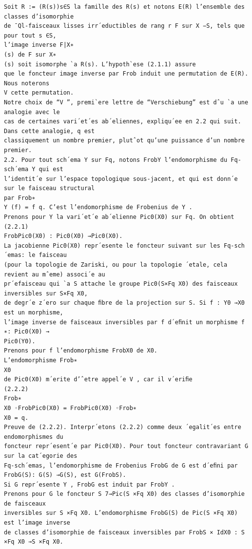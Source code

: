 \documentclass[11pt]{article}
\begin{document}
\begin{Verbatim}[breaklines=true,fontsize=\small]
Soit R := (R(s))s∈S la famille des R(s) et notons E(R) l’ensemble des classes d’isomorphie
de ¯Ql-faisceaux lisses irr´eductibles de rang r F sur X −S, tels que pour tout s ∈S,
l’image inverse F|X∗
(s) de F sur X∗
(s) soit isomorphe `a R(s). L’hypoth`ese (2.1.1) assure
que le foncteur image inverse par Frob induit une permutation de E(R). Nous noterons
V cette permutation.
Notre choix de “V ”, premi`ere lettre de “Verschiebung” est dˆu `a une analogie avec le
cas de certaines vari´et´es ab´eliennes, expliqu´ee en 2.2 qui suit. Dans cette analogie, q est
classiquement un nombre premier, plutˆot qu’une puissance d’un nombre premier.
2.2. Pour tout sch´ema Y sur Fq, notons FrobY l’endomorphisme du Fq-sch´ema Y qui est
l’identit´e sur l’espace topologique sous-jacent, et qui est donn´e sur le faisceau structural
par Frob∗
Y (f) = f q. C’est l’endomorphisme de Frobenius de Y .
Prenons pour Y la vari´et´e ab´elienne Pic0(X0) sur Fq. On obtient
(2.2.1)
FrobPic0(X0) : Pic0(X0) →Pic0(X0).
La jacobienne Pic0(X0) repr´esente le foncteur suivant sur les Fq-sch´emas: le faisceau
(pour la topologie de Zariski, ou pour la topologie ´etale, cela revient au mˆeme) associ´e au
pr´efaisceau qui `a S attache le groupe Pic0(S×Fq X0) des faisceaux inversibles sur S×Fq X0,
de degr´e z´ero sur chaque ﬁbre de la projection sur S. Si f : Y0 →X0 est un morphisme,
l’image inverse de faisceaux inversibles par f d´eﬁnit un morphisme f ∗: Pic0(X0) →
Pic0(Y0).
Prenons pour f l’endomorphisme FrobX0 de X0.
L’endomorphisme Frob∗
X0
de Pic0(X0) m´erite d’ˆetre appel´e V , car il v´eriﬁe
(2.2.2)
Frob∗
X0 ◦FrobPic0(X0) = FrobPic0(X0) ◦Frob∗
X0 = q.
Preuve de (2.2.2). Interpr´etons (2.2.2) comme deux ´egalit´es entre endomorphismes du
foncteur repr´esent´e par Pic0(X0). Pour tout foncteur contravariant G sur la cat´egorie des
Fq-sch´emas, l’endomorphisme de Frobenius FrobG de G est d´eﬁni par
FrobG(S): G(S) →G(S), est G(FrobS).
Si G repr´esente Y , FrobG est induit par FrobY .
Prenons pour G le foncteur S 7→Pic(S ×Fq X0) des classes d’isomorphie de faisceaux
inversibles sur S ×Fq X0. L’endomorphisme FrobG(S) de Pic(S ×Fq X0) est l’image inverse
de classes d’isomorphie de faisceaux inversibles par FrobS × IdX0 : S ×Fq X0 →S ×Fq X0.


\end{Verbatim}
\end{document}

